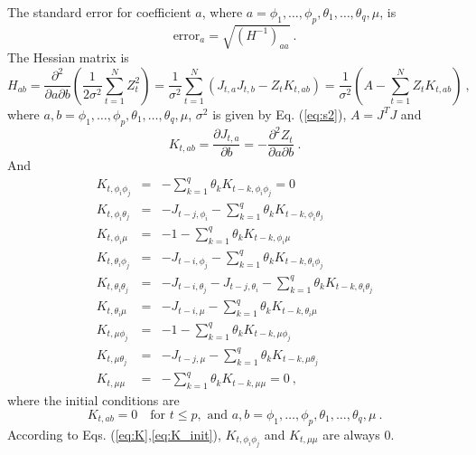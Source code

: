 The standard error for coefficient $a$, where $a=\phi_1,\dots,\phi_p,\theta_1,\dots,\theta_q,\mu$, is 
\begin{equation}
\mbox{error}_a = \sqrt{(H^{-1})_{aa}}\ .
\end{equation}
The Hessian matrix is 
\begin{equation}
H_{ab} = \frac{\partial^2}{\partial a \partial b}
\left(\frac{1}{2\sigma^2}\sum_{t=1}^N Z_t^2 \right) =
\frac{1}{\sigma^2}\sum_{t=1}^N 
\left(J_{t,a}J_{t,b} - 
  Z_t K_{t,ab} \right) = \frac{1}{\sigma^2}\left(
  A - \sum_{t=1}^N Z_t K_{t,ab}\right)\ ,
\end{equation}
where $a,b=\phi_1,\dots,\phi_p,\theta_1,\dots,\theta_q,\mu$,
$\sigma^2$ is given by Eq. (\ref{eq:s2}), $A=J^TJ$ and 
\begin{equation}
K_{t,ab}=\frac{\partial J_{t,a}}{\partial b} = - \frac{\partial^2
  Z_t}{\partial a \partial b} \ .
\end{equation}
And
\begin{eqnarray}
K_{t,\phi_i\phi_j} &=& -\sum_{k=1}^q \theta_k K_{t-k,\phi_i\phi_j} = 0
\nonumber\\
K_{t,\phi_i\theta_j} &=& -J_{t-j,\phi_i} - \sum_{k=1}^q\theta_k
K_{t-k,\phi_i\theta_j} \nonumber\\
K_{t,\phi_i\mu} &=& -1 -\sum_{k=1}^q\theta_k
K_{t-k,\phi_i\mu}\nonumber \\
K_{t,\theta_i\phi_j} &=& -J_{t-i,\phi_j}-\sum_{k=1}^q\theta_k
K_{t-k,\theta_i\phi_j} \nonumber\\
K_{t,\theta_i\theta_j} &=& -J_{t-i,\theta_j} - J_{t-j,\theta_i} -
\sum_{k=1}^q \theta_k K_{t-k,\theta_i\theta_j} \nonumber \\
K_{t,\theta_i\mu} &=& -J_{t-i,\mu} - \sum_{k=1}^q\theta_k
K_{t-k,\theta_i\mu} \nonumber\\
K_{t,\mu\phi_j} &=& -1-\sum_{k=1}^q \theta_k K_{t-k,\mu\phi_j}
\nonumber \\
K_{t,\mu\theta_j} &=& -J_{t-j,\mu} -\sum_{k=1}^q \theta_k
K_{t-k,\mu\theta_j} \nonumber \\
K_{t,\mu\mu} &=& - \sum_{k=1}^q \theta_k K_{t-k,\mu\mu} = 0\ , \label{eq:K}
\end{eqnarray}
where the initial conditions are
\begin{equation}
K_{t,ab} = 0\quad \mbox{for } t\leq p, \mbox{ and }
a,b=\phi_1,\dots,\phi_p,\theta_1,\dots,\theta_q,\mu\ . \label{eq:K_init}
\end{equation}
According to Eqs. (\ref{eq:K},\ref{eq:K_init}), $K_{t,\phi_i\phi_j}$ and
$K_{t,\mu\mu}$ are always $0$.

